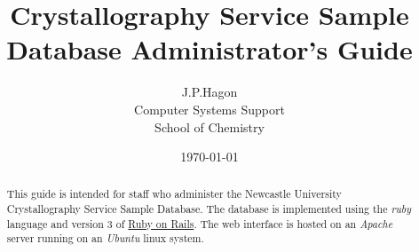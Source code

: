 \documentclass[12pt]{article}
\title{\sffamily\bfseries Crystallography Service Sample Database Administrator's Guide}
\author{J.P.Hagon\\Computer Systems Support\\School of Chemistry}
\date{\today}
\begin{document}
\maketitle
\begin{abstract}
This guide is intended for staff who administer the Newcastle University
Crystallography Service Sample Database.
The database is implemented using the \emph{ruby} language and version 3 of 
\href{http://rubyonrails.org}{Ruby on Rails}.
The web interface is hosted on an \emph{Apache} server running on an
\emph{Ubuntu} linux system.
\end{abstract}
\newpage
\tableofcontents
\newpage
\end{document}
